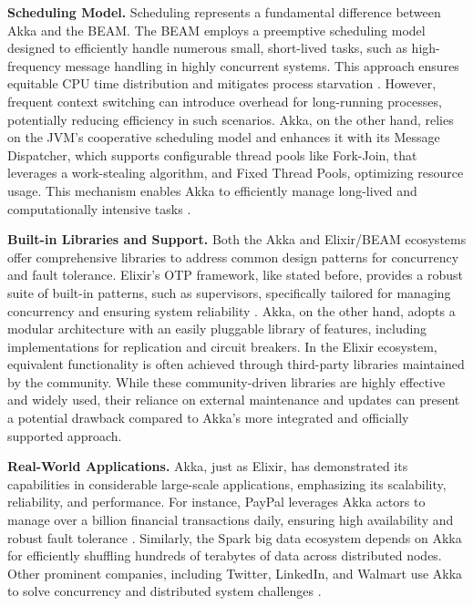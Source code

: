 \textbf{Scheduling Model.} Scheduling represents a fundamental difference between Akka and the \gls{BEAM}. The \gls{BEAM} employs a preemptive scheduling model designed to efficiently handle numerous small, short-lived tasks, such as high-frequency message handling in highly concurrent systems. This approach ensures equitable CPU time distribution and mitigates process starvation \cite{Juric2024,elixir-docs-hexdocs,erlang-concurrency-blog}. However, frequent context switching can introduce overhead for long-running processes, potentially reducing efficiency in such scenarios. Akka, on the other hand, relies on the \gls{JVM}’s cooperative scheduling model and enhances it with its Message Dispatcher, which supports configurable thread pools like Fork-Join, that leverages a work-stealing algorithm, and Fixed Thread Pools, optimizing resource usage. This mechanism enables Akka to efficiently manage long-lived and computationally intensive tasks \cite{akka-docs,Abraham2023}.

\textbf{Built-in Libraries and Support.} Both the Akka and Elixir/\gls{BEAM} ecosystems offer comprehensive libraries to address common design patterns for concurrency and fault tolerance. Elixir’s \gls{OTP} framework, like stated before, provides a robust suite of built-in patterns, such as supervisors, specifically tailored for managing concurrency and ensuring system reliability \cite{erlang-concurrency-blog,elixir-docs-hexdocs}. Akka, on the other hand, adopts a modular architecture with an easily pluggable library of features, including implementations for replication and circuit breakers. In the Elixir ecosystem, equivalent functionality is often achieved through third-party libraries maintained by the community. While these community-driven libraries are highly effective and widely used, their reliance on external maintenance and updates can present a potential drawback compared to Akka’s more integrated and officially supported approach.

\textbf{Real-World Applications.} Akka, just as Elixir, has demonstrated its capabilities in considerable large-scale applications, emphasizing its scalability, reliability, and performance. For instance, PayPal leverages Akka actors to manage over a billion financial transactions daily, ensuring high availability and robust fault tolerance \cite{Bagherzadeh2020}. Similarly, the Spark big data ecosystem depends on Akka for efficiently shuffling hundreds of terabytes of data across distributed nodes. Other prominent companies, including Twitter, LinkedIn, and Walmart use Akka to solve concurrency and distributed system challenges \cite{Bagherzadeh2020,akka-docs}.

